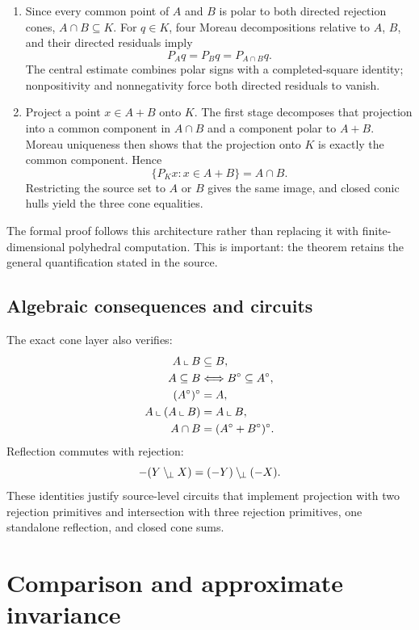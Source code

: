 \documentclass[11pt,a4paper]{article}
\begin{document}
\begin{enumerate}
  \item Since every common point of \(A\) and \(B\) is polar to both directed
    rejection cones, \(A\cap B\subseteq K\). For \(q\in K\), four Moreau
    decompositions relative to \(A\), \(B\), and their directed residuals
    imply
    \[
      P_Aq=P_Bq=P_{A\cap B}q.
    \]
    The central estimate combines polar signs with a completed-square
    identity; nonpositivity and nonnegativity force both directed residuals
    to vanish.
  \item Project a point \(x\in A+B\) onto \(K\). The first stage decomposes
    that projection into a common component in \(A\cap B\) and a component
    polar to \(A+B\). Moreau uniqueness then shows that the projection onto
    \(K\) is exactly the common component. Hence
    \[
      \{P_Kx:x\in A+B\}=A\cap B.
    \]
    Restricting the source set to \(A\) or \(B\) gives the same image, and
    closed conic hulls yield the three cone equalities.
\end{enumerate}

The formal proof follows this architecture rather than replacing it with
finite-dimensional polyhedral computation. This is important: the theorem
retains the general quantification stated in the source.

\subsection{Algebraic consequences and circuits}

The exact cone layer also verifies:
\[
\begin{aligned}
  A\mathbin{\llcorner} B&\subseteq B,\\
  A\subseteq B&\Longleftrightarrow B^\circ\subseteq A^\circ,\\
  (A^\circ)^\circ&=A,\\
  A\mathbin{\llcorner}(A\mathbin{\llcorner} B)&=A\mathbin{\llcorner} B,\\
  A\cap B&=(A^\circ+B^\circ)^\circ.
\end{aligned}
\]
Reflection commutes with rejection:
\[
  -(Y\mathbin{\backslash_{\!\perp}} X)=(-Y)\mathbin{\backslash_{\!\perp}}(-X).
\]
These identities justify source-level circuits that implement projection
with two rejection primitives and intersection with three rejection
primitives, one standalone reflection, and closed cone sums.

\section{Comparison and approximate invariance}
\label{sec:approximation}
\end{document}

